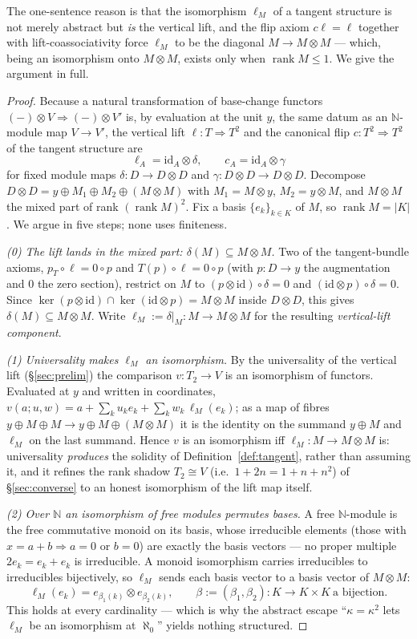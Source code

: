 \documentclass[11pt]{article}
\theoremstyle{definition}
\newcommand{\N}{\mathbb{N}}
\newcommand{\id}{\mathrm{id}}
\newcommand{\rank}{\operatorname{rank}}
\renewcommand{\ker}{\operatorname{ker}}
\begin{document}
The one-sentence reason is that the isomorphism $\ell_M$ of a tangent structure is not merely abstract
but \emph{is} the vertical lift, and the flip axiom $c\ell=\ell$ together with lift-coassociativity
force $\ell_M$ to be the diagonal $M\to M\otimes M$ --- which, being an isomorphism onto $M\otimes M$,
exists only when $\rank M\le1$. We give the argument in full.

\begin{proof}
Because a natural transformation of base-change functors $(-)\otimes V\Rightarrow(-)\otimes V'$ is,
by evaluation at the unit $y$, the same datum as an $\N$-module map $V\to V'$, the vertical lift
$\ell\colon T\Rightarrow T^2$ and the canonical flip $c\colon T^2\Rightarrow T^2$ of the tangent
structure are
\[
  \ell_A=\id_A\otimes\delta,\qquad c_A=\id_A\otimes\gamma
\]
for fixed module maps $\delta\colon D\to D\otimes D$ and $\gamma\colon D\otimes D\to D\otimes D$.
Decompose $D\otimes D=y\oplus M_1\oplus M_2\oplus(M\otimes M)$ with $M_1=M\otimes y$, $M_2=y\otimes M$,
and $M\otimes M$ the mixed part of rank $(\rank M)^2$. Fix a basis $\{e_k\}_{k\in K}$ of $M$, so
$\rank M=|K|$. We argue in five steps; none uses finiteness.

\emph{(0) The lift lands in the mixed part: $\delta(M)\subseteq M\otimes M$.} Two of the
tangent-bundle axioms, $p_T\circ\ell=0\circ p$ and $T(p)\circ\ell=0\circ p$ (with $p\colon D\to y$ the
augmentation and $0$ the zero section), restrict on $M$ to $(p\otimes\id)\circ\delta=0$ and
$(\id\otimes p)\circ\delta=0$. Since $\ker(p\otimes\id)\cap\ker(\id\otimes p)=M\otimes M$ inside
$D\otimes D$, this gives $\delta(M)\subseteq M\otimes M$. Write $\ell_M:=\delta|_M\colon M\to M\otimes
M$ for the resulting \emph{vertical-lift component}.

\emph{(1) Universality makes $\ell_M$ an isomorphism.} By the universality of the vertical lift
(\S\ref{sec:prelim}) the comparison $v\colon T_2\to V$ is an isomorphism of functors. Evaluated at $y$
and written in coordinates, $v(a;u,w)=a+\sum_{k}u_k e_k+\sum_{k}w_k\,\ell_M(e_k)$; as a map of fibres
$y\oplus M\oplus M\to y\oplus M\oplus(M\otimes M)$ it is the identity on the summand $y\oplus M$ and
$\ell_M$ on the last summand. Hence $v$ is an isomorphism iff
$\ell_M\colon M\to M\otimes M$ is: universality \emph{produces} the solidity of
Definition~\ref{def:tangent}, rather than assuming it, and it refines the rank shadow $T_2\cong V$
(i.e.\ $1+2n=1+n+n^2$) of \S\ref{sec:converse} to an honest isomorphism of the lift map itself.

\emph{(2) Over $\N$ an isomorphism of free modules permutes bases.} A free $\N$-module is the free
commutative monoid on its basis, whose irreducible elements (those with $x=a+b\Rightarrow a=0$ or
$b=0$) are exactly the basis vectors --- no proper multiple $2e_k=e_k+e_k$ is irreducible. A monoid
isomorphism carries irreducibles to irreducibles bijectively, so $\ell_M$ sends each basis vector to a
basis vector of $M\otimes M$:
\[
  \ell_M(e_k)=e_{\beta_1(k)}\otimes e_{\beta_2(k)},\qquad
  \beta:=(\beta_1,\beta_2)\colon K\to K\times K\ \text{a bijection.}
\]
This holds at every cardinality --- which is why the abstract escape ``$\kappa=\kappa^2$ lets $\ell_M$
be an isomorphism at $\aleph_0$'' yields nothing structured.


\end{proof}
\end{document}
